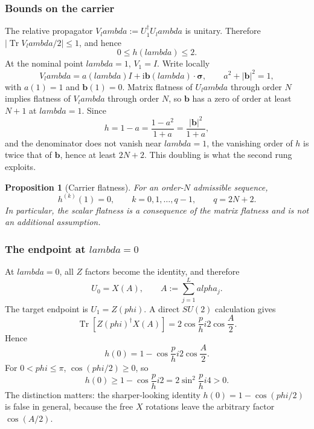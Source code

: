 \documentclass[%
  aps,
  pra,
  preprint,
  superscriptaddress,
  amsmath,amssymb,
  nofootinbib,
  floatfix,
]{revtex4-2}
\def\lambda{lambda}\def\tau{tau}\def\phi{phi}\def\alpha{alpha}%
\newtheorem{proposition}[theorem]{Proposition}
\theoremstyle{definition}
\theoremstyle{remark}
\newcommand{\Tr}{\operatorname{Tr}}
\begin{document}
\subsubsection{Bounds on the carrier}

The relative propagator $V_\lambda:=U_1^\dagger U_\lambda$ is unitary. Therefore
$|\Tr V_\lambda/2|\le1$, and hence
\begin{equation}
0\le h(\lambda)\le2.
\label{eq:h-bounds}
\end{equation}
At the nominal point $\lambda=1$, $V_1=I$. Write locally
\[
V_\lambda=a(\lambda)I+\mathrm{i}\bm b(\lambda)\cdot\bm\sigma,
\qquad a^2+|\bm b|^2=1,
\]
with $a(1)=1$ and $\bm b(1)=0$. Matrix flatness of $U_\lambda$ through order $N$ implies
flatness of $V_\lambda$ through order $N$, so $\bm b$ has a zero of order at least $N+1$ at
$\lambda=1$. Since
\[
h=1-a=\frac{1-a^2}{1+a}
=\frac{|\bm b|^2}{1+a},
\]
and the denominator does not vanish near $\lambda=1$, the vanishing order of $h$ is twice that
of $\bm b$, hence at least $2N+2$. This doubling is what the second rung exploits.

\begin{proposition}[Carrier flatness]
\label{prop:flatness}
For an order-$N$ admissible sequence,
\begin{equation}
h^{(k)}(1)=0,
\qquad k=0,1,\ldots,q-1,
\qquad q=2N+2.
\label{eq:hflat}
\end{equation}
In particular, the scalar flatness is a consequence of the matrix flatness and is not an additional
assumption.
\end{proposition}

\subsubsection{The endpoint at \texorpdfstring{$\lambda=0$}{lambda=0}}

At $\lambda=0$, all $Z$ factors become the identity, and therefore
\begin{equation}
U_0=X(A),
\qquad A:=\sum_{j=1}^L\alpha_j.
\label{eq:u0}
\end{equation}
The target endpoint is $U_1=Z(\phi)$. A direct $SU(2)$ calculation gives
\begin{equation}
\Tr\![Z(\phi)^\dagger X(A)]
=2\cos\frac\phi2\cos\frac A2.
\end{equation}
Hence
\begin{equation}
\displaystyle
h(0)=1-\cos\frac\phi2\cos\frac A2.
\label{eq:h0exact}
\end{equation}
For $0<\phi\le\pi$, $\cos(\phi/2)\ge0$, so
\begin{equation}
h(0)\ge1-\cos\frac\phi2
=2\sin^2\frac\phi4>0.
\label{eq:h0lower}
\end{equation}
The distinction matters: the sharper-looking identity $h(0)=1-\cos(\phi/2)$ is false in
general, because the free $X$ rotations leave the arbitrary factor $\cos(A/2)$.
\end{document}
